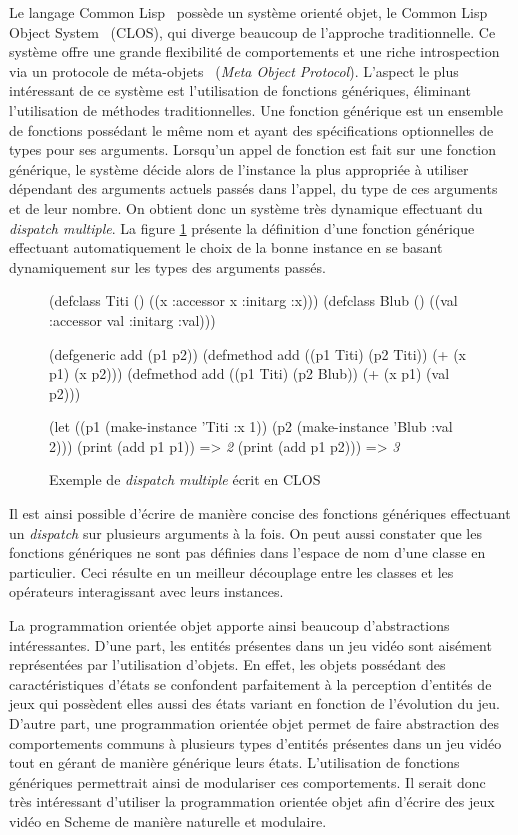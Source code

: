 \documentclass[12pt,twoside,letterpaper,francais]{book}
\newcommand{\schemeresult}[1]{{\it #1}}
\begin{document}
Le langage Common Lisp~\cite{CLISP} possède un système orienté objet,
le Common Lisp Object System~\cite{CLOS} (CLOS), qui diverge beaucoup
de l'approche traditionnelle. Ce système offre une grande flexibilité
de comportements et une riche introspection via un protocole de
méta-objets~\cite{MOP} (\textit{Meta Object Protocol}). L'aspect le
plus intéressant de ce système est l'utilisation de fonctions
génériques, éliminant l'utilisation de méthodes traditionnelles. Une
fonction générique est un ensemble de fonctions possédant le même nom
et ayant des spécifications optionnelles de types pour ses
arguments. Lorsqu'un appel de fonction est fait sur une fonction
générique, le système décide alors de l'instance la plus appropriée à
utiliser dépendant des arguments actuels passés dans l'appel, du type
de ces arguments et de leur nombre. On obtient donc un système très
dynamique effectuant du \textit{dispatch multiple}. La figure
\ref{OO:CLOS_ex} présente la définition d'une fonction générique
effectuant automatiquement le choix de la bonne instance en se basant
dynamiquement sur les types des arguments passés.\\

\begin{figure}[h!]
  \begin{schemecode}
(defclass Titi () ((x :accessor x :initarg :x)))
(defclass Blub () ((val :accessor val :initarg :val)))

(defgeneric add (p1 p2))
(defmethod add ((p1 Titi) (p2 Titi)) (+ (x p1) (x p2)))
(defmethod add ((p1 Titi) (p2 Blub)) (+ (x p1) (val p2)))

(let ((p1 (make-instance 'Titi :x 1))
      (p2 (make-instance 'Blub :val 2)))
  (print (add p1 p1))  => \schemeresult{2}
  (print (add p1 p2))) => \schemeresult{3}
  \end{schemecode}
  \caption{Exemple de \textit{dispatch multiple} écrit en CLOS}
  \label{OO:CLOS_ex}
\end{figure}

Il est ainsi possible d'écrire de manière concise des fonctions
génériques effectuant un \textit{dispatch} sur plusieurs arguments à
la fois. On peut aussi constater que les fonctions génériques ne sont
pas définies dans l'espace de nom d'une classe en particulier. Ceci
résulte en un meilleur découplage entre les classes et les opérateurs
interagissant avec leurs instances.

La programmation orientée objet apporte ainsi beaucoup d'abstractions
intéressantes. D'une part, les entités présentes dans un jeu vidéo
sont aisément représentées par l'utilisation d'objets. En effet, les
objets possédant des caractéristiques d'états se confondent
parfaitement à la perception d'entités de jeux qui possèdent elles
aussi des états variant en fonction de l'évolution du jeu. D'autre
part, une programmation orientée objet permet de faire abstraction des
comportements communs à plusieurs types d'entités présentes dans un
jeu vidéo tout en gérant de manière générique leurs états.
L'utilisation de fonctions génériques permettrait ainsi de modulariser
ces comportements. Il serait donc très intéressant d'utiliser la
programmation orientée objet afin d'écrire des jeux vidéo en
Scheme de manière naturelle et modulaire.
\end{document}
